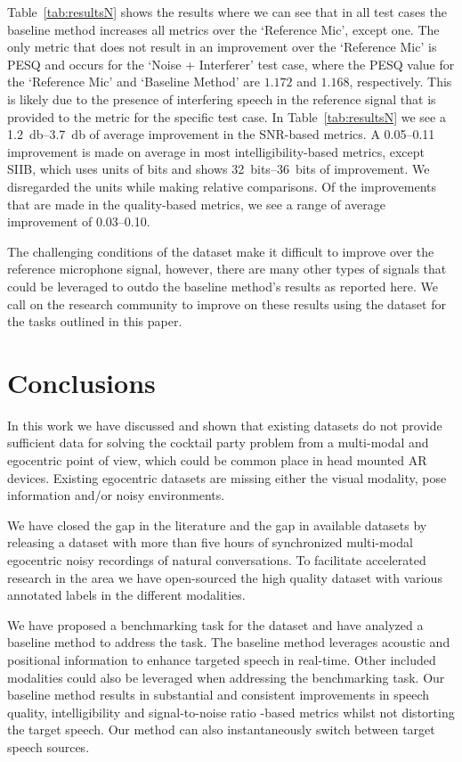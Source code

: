 \documentclass[journal]{IEEEtran}
\begin{document}
Table~\ref{tab:resultsN} shows the results where we can see that in all test cases the baseline method increases all metrics over the `Reference Mic', except one.
The only metric that does not result in an improvement over the `Reference Mic' is PESQ and occurs for the `Noise + Interferer' test case, where the PESQ value for the `Reference Mic' and `Baseline Method' are $1.172$ and $1.168$, respectively.
This is likely due to the presence of interfering speech in the reference signal that is provided to the metric for the specific test case.
In Table~\ref{tab:resultsN} we see a \SIrange{1.2}{3.7}{\decibel} of average improvement in the SNR-based metrics.
A \SIrange{0.05}{0.11}{} improvement is made on average in most intelligibility-based metrics, except SIIB, which uses units of bits and shows \SIrange{32}{36}{bits} of improvement. We disregarded the units while making relative comparisons.
Of the improvements that are made in the quality-based metrics, we see a range of average improvement of \SIrange{0.03}{0.10}{}.

The challenging conditions of the dataset make it difficult to improve over the reference microphone signal, however, there are many other types of signals that could be leveraged to outdo the baseline method's results as reported here.
We call on the research community to improve on these results using the dataset for the tasks outlined in this paper.

 

\section{Conclusions} \label{sec:Conclusions}
In this work we have discussed and shown that existing datasets do not provide sufficient data for solving the cocktail party problem from a multi-modal and egocentric point of view, which could be common place in head mounted AR devices.
Existing egocentric datasets are missing either the visual modality, pose information and/or noisy environments.

We have closed the gap in the literature and the gap in available datasets by releasing a dataset with more than five hours of synchronized multi-modal egocentric noisy recordings of natural conversations.
To facilitate accelerated research in the area we have open-sourced the high quality dataset with various annotated labels in the different modalities.


We have proposed a benchmarking task for the dataset and have analyzed a baseline method to address the task.
The baseline method leverages acoustic and positional information to enhance targeted speech in real-time.
Other included modalities could also be leveraged when addressing the benchmarking task.
Our baseline method results in substantial and consistent improvements in speech quality, intelligibility and signal-to-noise ratio -based metrics whilst not distorting the target speech.
Our method can also instantaneously switch between target speech sources.
\end{document}
